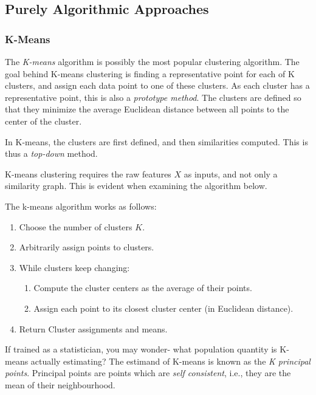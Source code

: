 \documentclass[]{book}
\providecommand{\tightlist}{%
  \setlength{\itemsep}{0pt}\setlength{\parskip}{0pt}}
\theoremstyle{definition}
\theoremstyle{definition}
\theoremstyle{definition}
\theoremstyle{remark}
\let\BeginKnitrBlock\begin \let\EndKnitrBlock\end
\begin{document}
\hypertarget{purely-algorithmic-approaches-1}{%
\subsection{Purely Algorithmic Approaches}\label{purely-algorithmic-approaches-1}}

\hypertarget{k-means}{%
\subsubsection{K-Means}\label{k-means}}

The \emph{K-means} algorithm is possibly the most popular clustering algorithm.
The goal behind K-means clustering is finding a representative point for each of K clusters, and assign each data point to one of these clusters.
As each cluster has a representative point, this is also a \emph{prototype method}.
The clusters are defined so that they minimize the average Euclidean distance between all points to the center of the cluster.

In K-means, the clusters are first defined, and then similarities computed.
This is thus a \emph{top-down} method.

K-means clustering requires the raw features \(X\) as inputs, and not only a similarity graph.
This is evident when examining the algorithm below.

The k-means algorithm works as follows:

\begin{enumerate}
\def\labelenumi{\arabic{enumi}.}
\tightlist
\item
  Choose the number of clusters \(K\).
\item
  Arbitrarily assign points to clusters.
\item
  While clusters keep changing:

  \begin{enumerate}
  \def\labelenumii{\arabic{enumii}.}
  \tightlist
  \item
    Compute the cluster centers as the average of their points.
  \item
    Assign each point to its closest cluster center (in Euclidean distance).
  \end{enumerate}
\item
  Return Cluster assignments and means.
\end{enumerate}

\BeginKnitrBlock{remark}
{}If trained as a statistician, you may wonder- what population quantity is K-means actually estimating?
The estimand of K-means is known as the \emph{K principal points}.
Principal points are points which are \emph{self consistent}, i.e., they are the mean of their neighbourhood.
\EndKnitrBlock{remark}
\end{document}
